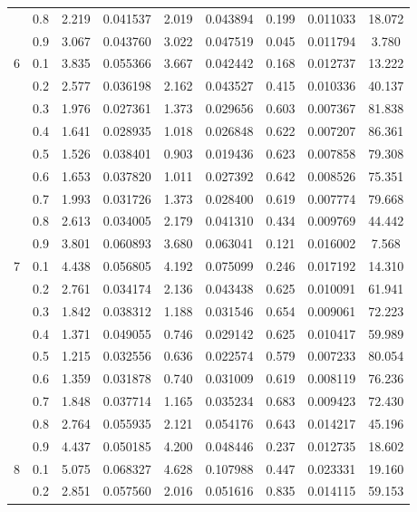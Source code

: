 \begin{longtable}{ | c | c || c | c | c | c | c | c | c | }
 & 0.8 & 2.219 & 0.041537 & 2.019 & 0.043894 & 0.199 & 0.011033 & 18.072 \\
 & 0.9 & 3.067 & 0.043760 & 3.022 & 0.047519 & 0.045 & 0.011794 & 3.780 \\
 \hline
\multirow{9}{*}{6} & 0.1 & 3.835 & 0.055366 & 3.667 & 0.042442 & 0.168 & 0.012737 & 13.222 \\
 & 0.2 & 2.577 & 0.036198 & 2.162 & 0.043527 & 0.415 & 0.010336 & 40.137 \\
 & 0.3 & 1.976 & 0.027361 & 1.373 & 0.029656 & 0.603 & 0.007367 & 81.838 \\
 & 0.4 & 1.641 & 0.028935 & 1.018 & 0.026848 & 0.622 & 0.007207 & 86.361 \\
 & 0.5 & 1.526 & 0.038401 & 0.903 & 0.019436 & 0.623 & 0.007858 & 79.308 \\
 & 0.6 & 1.653 & 0.037820 & 1.011 & 0.027392 & 0.642 & 0.008526 & 75.351 \\
 & 0.7 & 1.993 & 0.031726 & 1.373 & 0.028400 & 0.619 & 0.007774 & 79.668 \\
 & 0.8 & 2.613 & 0.034005 & 2.179 & 0.041310 & 0.434 & 0.009769 & 44.442 \\
 & 0.9 & 3.801 & 0.060893 & 3.680 & 0.063041 & 0.121 & 0.016002 & 7.568 \\
 \hline
\multirow{9}{*}{7} & 0.1 & 4.438 & 0.056805 & 4.192 & 0.075099 & 0.246 & 0.017192 & 14.310 \\
 & 0.2 & 2.761 & 0.034174 & 2.136 & 0.043438 & 0.625 & 0.010091 & 61.941 \\
 & 0.3 & 1.842 & 0.038312 & 1.188 & 0.031546 & 0.654 & 0.009061 & 72.223 \\
 & 0.4 & 1.371 & 0.049055 & 0.746 & 0.029142 & 0.625 & 0.010417 & 59.989 \\
 & 0.5 & 1.215 & 0.032556 & 0.636 & 0.022574 & 0.579 & 0.007233 & 80.054 \\
 & 0.6 & 1.359 & 0.031878 & 0.740 & 0.031009 & 0.619 & 0.008119 & 76.236 \\
 & 0.7 & 1.848 & 0.037714 & 1.165 & 0.035234 & 0.683 & 0.009423 & 72.430 \\
 & 0.8 & 2.764 & 0.055935 & 2.121 & 0.054176 & 0.643 & 0.014217 & 45.196 \\
 & 0.9 & 4.437 & 0.050185 & 4.200 & 0.048446 & 0.237 & 0.012735 & 18.602 \\
 \hline
\multirow{9}{*}{8} & 0.1 & 5.075 & 0.068327 & 4.628 & 0.107988 & 0.447 & 0.023331 & 19.160 \\
 & 0.2 & 2.851 & 0.057560 & 2.016 & 0.051616 & 0.835 & 0.014115 & 59.153 \\

\end{longtable}
